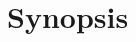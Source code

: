 \documentclass[11pt,a4paper,final]{article}
\begin{document}
 %


\newpage
\section{Synopsis}

\end{document}
